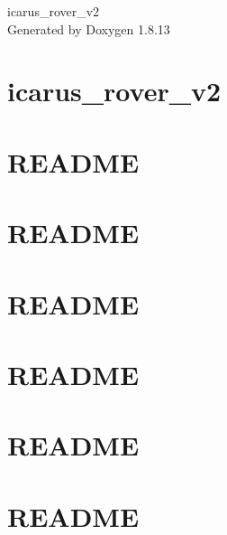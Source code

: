 \documentclass[twoside]{book}
\newcommand{\+}{\discretionary{\mbox{\scriptsize$\hookleftarrow$}}{}{}}
\newcommand{\clearemptydoublepage}{%
  \newpage{\pagestyle{empty}\cleardoublepage}%
}
\begin{document}
\hypersetup{pageanchor=false,
             bookmarksnumbered=true,
             pdfencoding=unicode
            }
\begin{titlepage}
\vspace*{7cm}
\begin{center}%
{\Large icarus\+\_\+rover\+\_\+v2 }\\
\vspace*{1cm}
{\large Generated by Doxygen 1.8.13}\\
\end{center}
\end{titlepage}
\clearemptydoublepage
{}
\tableofcontents
\clearemptydoublepage
{}
\hypersetup{pageanchor=true}

\chapter{icarus\+\_\+rover\+\_\+v2}
\label{md_README}

\chapter{R\+E\+A\+D\+ME}
\label{md_src_Board_README}

\chapter{R\+E\+A\+D\+ME}
\label{md_src_Communication_README}

\chapter{R\+E\+A\+D\+ME}
\label{md_src_Control_README}

\chapter{R\+E\+A\+D\+ME}
\label{md_src_Diagnostics_README}

\chapter{R\+E\+A\+D\+ME}
\label{md_src_Dynamics_README}

\chapter{R\+E\+A\+D\+ME}
\label{md_src_Pose_README}

\end{document}
